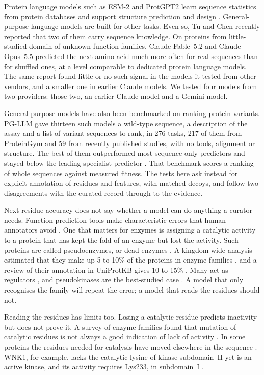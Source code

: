 \documentclass[11pt]{article}
\begin{document}
Protein language models such as ESM-2 and ProtGPT2 learn sequence statistics from protein databases and
support structure prediction and design \citep{lin2023esm2,ferruz2022protgpt2}. General-purpose language
models are built for other tasks. Even so, Tu and Chen \citep{tu2026claude,tu2026probe} recently reported that two of them carry sequence
knowledge. On proteins from little-studied domain-of-unknown-function families, Claude Fable~5.2 and
Claude Opus~5.5 predicted the next amino acid much more often for real sequences than for shuffled ones,
at a level comparable to dedicated protein language models. The same report found little or no such
signal in the models it tested from other vendors, and a smaller one in earlier Claude models. We tested four models from two providers: those two, an earlier Claude
model and a Gemini model.

General-purpose models have also been benchmarked on ranking protein variants. PG-LLM gave thirteen such
models a wild-type sequence, a description of the assay and a list of variant sequences to rank, in 276
tasks, 217 of them from ProteinGym and 59 from recently published studies, with no tools, alignment or structure. The best of them outperformed most
sequence-only predictors and stayed below the leading specialist predictor \citep{arora2026pgllm}. That
benchmark scores a ranking of whole sequences against measured fitness. The tests here ask instead for
explicit annotation of residues and features, with matched decoys, and follow two disagreements with the
curated record through to the evidence.

Next-residue accuracy does not say whether a model can do anything a curator needs. Function prediction
tools make characteristic errors that human annotators avoid \citep{decrecy2025limitations}. One that
matters for enzymes is assigning a catalytic activity to a protein that has kept the fold of an enzyme
but lost the activity. Such proteins are called pseudoenzymes, or dead enzymes
\citep{murphy2017biozombie,adrain2020dead}. A kingdom-wide analysis estimated that they make up 5 to 10\%
of the proteins in enzyme families \citep{ribeiro2019pseudoenzymes}, and a review of their annotation in
UniProtKB gives 10 to 15\% \citep{zaru2020uniprot}. Many act as regulators \citep{adrain2020dead}, and
pseudokinases are the best-studied case \citep{kwon2019pseudokinases}. A model that only recognises the
family will repeat the error; a model that reads the residues should not.

Reading the residues has limits too. Losing a catalytic residue predicts inactivity but does not prove
it. A survey of enzyme families found that mutation of catalytic residues is not always a good indication
of lack of activity \citep{ribeiro2020pitfalls}. In some proteins the residues needed for catalysis have
moved elsewhere in the sequence \citep{goldberg2023pseudoenzymes}. WNK1, for example, lacks the catalytic
lysine of kinase subdomain~II yet is an active kinase, and its activity requires Lys233, in
subdomain~I \citep{xu2000wnk1}.
\end{document}
